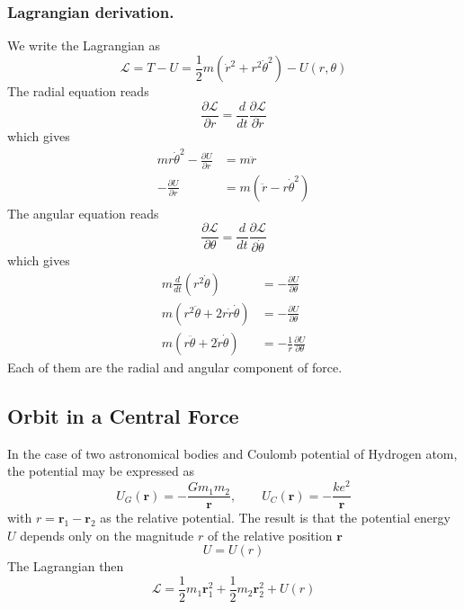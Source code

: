 \documentclass[../../../main.tex]{subfiles}
\begin{document}
\subsubsection{Lagrangian derivation.}
We write the Lagrangian as
\begin{equation*}
    \mathcal{L} = T - U = \frac{1}{2} m (\dot{r}^2 + r^2 \dot{\theta}^2) - U(r,\theta)
\end{equation*}
The radial equation reads
\begin{equation*}
    \frac{\partial \mathcal{L}}{\partial r} =\frac{d}{dt} \frac{\partial \mathcal{L}}{\partial \dot{r}}
\end{equation*}
which gives
\begin{align*}
    m r \dot{\theta}^2 - \frac{\partial U}{\partial r} & = m \ddot{r}                                  \\
    - \frac{\partial U}{\partial r}                    & =  m\left( \ddot{r}-r \dot{\theta}^2  \right)
\end{align*}
The angular equation reads
\begin{equation*}
    \frac{\partial \mathcal{L}}{\partial \theta} =\frac{d}{dt} \frac{\partial \mathcal{L}}{\partial \dot{\theta}}
\end{equation*}
which gives
\begin{align*}
    m \frac{d}{dt}(r^2 \dot{\theta})                 & =- \frac{\partial U}{\partial \theta}              \\
    m (r^2 \ddot{\theta} + 2 r \dot{r} \dot{\theta}) & = - \frac{\partial U}{\partial \theta}             \\
    m (r \ddot{\theta} + 2\dot{r} \dot{\theta})      & = - \frac{1 }{r}\frac{\partial U}{\partial \theta}
\end{align*}
Each of them are the radial and angular component of force.

\subsection{Orbit in a Central Force}
In the case of two astronomical bodies and Coulomb potential of Hydrogen atom, the potential may be expressed as
\begin{equation*}
    U_G(\mathbf{r })=-\frac{Gm_1m_2}{\mathbf{r}},\qquad
    U_C(\mathbf{r})=-\frac{ke^2 }{\mathbf{r}}
\end{equation*}
with $r=\mathbf{r}_1-\mathbf{r}_2$ as the relative potential.
The result is that the potential energy $U$ depends only on the magnitude $r$ of the relative position $\mathbf{r}$
\begin{equation*}
    U=U(r)
\end{equation*}
The Lagrangian then
\begin{equation*}
    \mathcal{L }=\frac{1 }{2 }m_1 \mathbf{r }_1^2+\frac{1 }{2 }m_2 \mathbf{r }_2^2+U(r)
\end{equation*}
\end{document}
